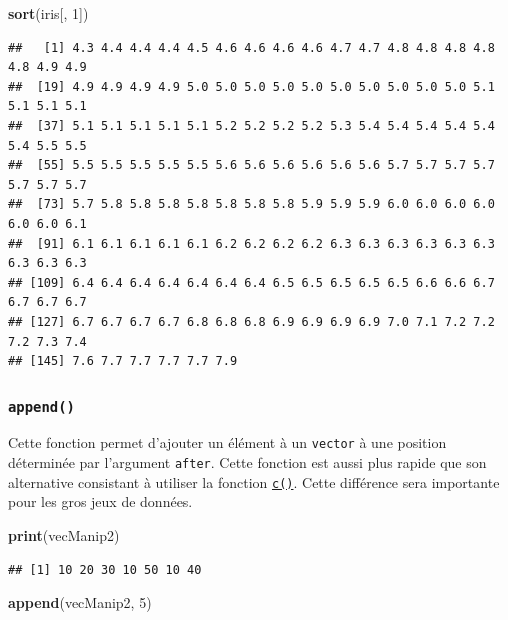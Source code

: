 \documentclass[
]{book}
\newenvironment{Shaded}{\begin{snugshade}}{\end{snugshade}}
\newcommand{\DecValTok}[1]{\textcolor[rgb]{0.00,0.00,0.81}{#1}}
\newcommand{\KeywordTok}[1]{\textcolor[rgb]{0.13,0.29,0.53}{\textbf{#1}}}
\newcommand{\NormalTok}[1]{#1}
\begin{document}
\begin{Shaded}
\begin{Highlighting}[]
\KeywordTok{sort}\NormalTok{(iris[, }\DecValTok{1}\NormalTok{])}
\end{Highlighting}
\end{Shaded}

\begin{verbatim}
##   [1] 4.3 4.4 4.4 4.4 4.5 4.6 4.6 4.6 4.6 4.7 4.7 4.8 4.8 4.8 4.8 4.8 4.9 4.9
##  [19] 4.9 4.9 4.9 4.9 5.0 5.0 5.0 5.0 5.0 5.0 5.0 5.0 5.0 5.0 5.1 5.1 5.1 5.1
##  [37] 5.1 5.1 5.1 5.1 5.1 5.2 5.2 5.2 5.2 5.3 5.4 5.4 5.4 5.4 5.4 5.4 5.5 5.5
##  [55] 5.5 5.5 5.5 5.5 5.5 5.6 5.6 5.6 5.6 5.6 5.6 5.7 5.7 5.7 5.7 5.7 5.7 5.7
##  [73] 5.7 5.8 5.8 5.8 5.8 5.8 5.8 5.8 5.9 5.9 5.9 6.0 6.0 6.0 6.0 6.0 6.0 6.1
##  [91] 6.1 6.1 6.1 6.1 6.1 6.2 6.2 6.2 6.2 6.3 6.3 6.3 6.3 6.3 6.3 6.3 6.3 6.3
## [109] 6.4 6.4 6.4 6.4 6.4 6.4 6.4 6.5 6.5 6.5 6.5 6.5 6.6 6.6 6.7 6.7 6.7 6.7
## [127] 6.7 6.7 6.7 6.7 6.8 6.8 6.8 6.9 6.9 6.9 6.9 7.0 7.1 7.2 7.2 7.2 7.3 7.4
## [145] 7.6 7.7 7.7 7.7 7.7 7.9
\end{verbatim}

\hypertarget{l015append}{%
\subsubsection{\texorpdfstring{\texttt{append()}}{append()}}\label{l015append}}

Cette fonction permet d'ajouter un élément à un \texttt{vector} à une position déterminée par l'argument \texttt{after}. Cette fonction est aussi plus rapide que son alternative consistant à utiliser la fonction \protect\hyperlink{l014vector}{\texttt{c()}}. Cette différence sera importante pour les gros jeux de données.

\begin{Shaded}
\begin{Highlighting}[]
\KeywordTok{print}\NormalTok{(vecManip2)}
\end{Highlighting}
\end{Shaded}

\begin{verbatim}
## [1] 10 20 30 10 50 10 40
\end{verbatim}

\begin{Shaded}
\begin{Highlighting}[]
\KeywordTok{append}\NormalTok{(vecManip2, }\DecValTok{5}\NormalTok{)}
\end{Highlighting}
\end{Shaded}
\end{document}
